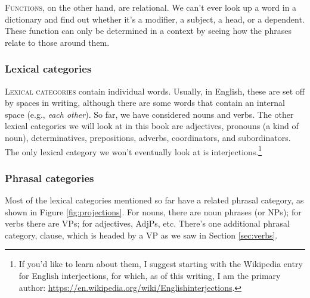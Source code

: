 \textsc{Functions}, on the other hand, are relational. We can't ever look up a word in a dictionary and find out whether it's a modifier, a subject, a head, or a dependent. These function can only be determined in a context by seeing how the phrases relate to those around them.

\subsubsection*{Lexical categories}

\textsc{Lexical categories} contain individual words. Usually, in English, these are set off by spaces in writing, although there are some words that contain an internal space (e.g., \textit{each other}). So far, we have considered nouns and verbs. The other lexical categories we will look at in this book are adjectives, pronouns (a kind of noun), determinatives, prepositions, adverbs, coordinators, and subordinators. The only lexical category we won't eventually look at is interjections.\footnote{If you'd like to learn about them, I suggest starting with the Wikipedia entry for English interjections, for which, as of this writing, I am the primary author: \href{https://en.wikipedia.org/wiki/English\textunderscore interjections}{https://en.wikipedia.org/wiki/English\textunderscore interjections}.}

\subsubsection*{Phrasal categories}

Most of the lexical categories mentioned so far have a related phrasal category, as shown in Figure \ref{fig:projections}. For nouns, there are noun phrases (or NPs); for verbs there are VPs; for adjectives, AdjPs, etc. There's one additional phrasal category, clause, which is headed by a VP as we saw in Section \ref{sec:verbs}.


